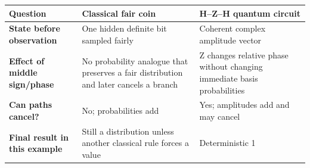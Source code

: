 \begin{center}
\begin{tabularx}{\textwidth}{>{\bfseries}lXX}
\toprule
Question & Classical fair coin & H--Z--H quantum circuit\\
\midrule
State before observation & One hidden definite bit sampled fairly &
Coherent complex amplitude vector\\
Effect of middle sign/phase & No probability analogue that preserves a fair
distribution and later cancels a branch & Z changes relative phase without
changing immediate basis probabilities\\
Can paths cancel? & No; probabilities add & Yes; amplitudes add and may cancel\\
Final result in this example & Still a distribution unless another classical
rule forces a value & Deterministic 1\\
\bottomrule
\end{tabularx}
\end{center}

